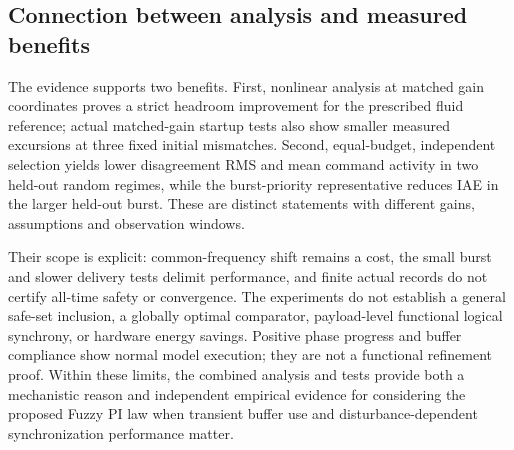 \subsection{Connection between analysis and measured benefits}
\label{subsec:eval_support}

The evidence supports two benefits. First, nonlinear analysis at
matched gain coordinates proves a strict headroom improvement for the
prescribed fluid reference; actual matched-gain startup tests also show
smaller measured excursions at three fixed initial mismatches. Second,
equal-budget, independent selection yields lower disagreement RMS and
mean command activity in two held-out random regimes, while the
burst-priority representative reduces IAE in the larger held-out burst.
These are distinct statements with different gains, assumptions and
observation windows.

Their scope is explicit: common-frequency shift remains a cost, the
small burst and slower delivery tests delimit performance, and finite
actual records do not certify all-time safety or convergence. The
experiments do not establish a general safe-set inclusion, a globally
optimal comparator, payload-level functional logical synchrony, or
hardware energy savings. Positive phase progress and buffer compliance
show normal model execution; they are not a functional refinement proof.
Within these limits, the combined analysis and tests provide both a
mechanistic reason and independent empirical evidence for considering
the proposed Fuzzy PI law when transient buffer use and
disturbance-dependent synchronization performance matter.



